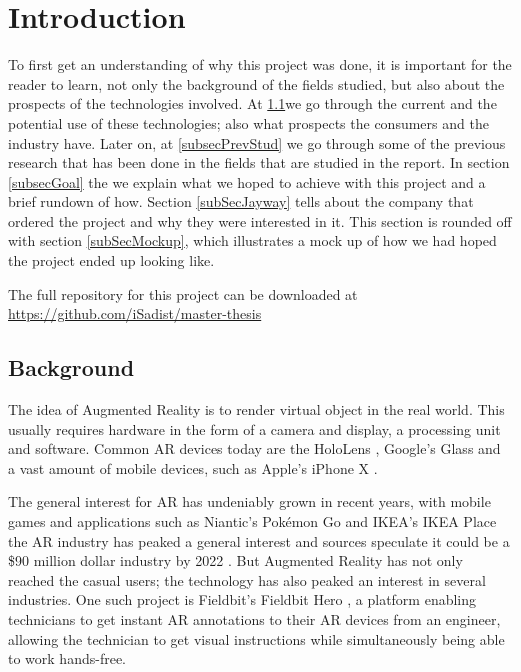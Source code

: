 \chapter{Introduction}
To first get an understanding of why this project was done, it is important for the reader to learn, not only the background of the fields studied, but also about the prospects of the technologies involved.
 At \ref{subsecBackground}we go through the current and the potential use of these technologies; also what prospects the consumers and the industry have. Later on, at  \ref{subsecPrevStud} we go through some of the previous research that has been done in the fields that are studied in the report. In section \ref{subsecGoal} the we explain what we hoped to achieve with this project and a brief rundown of how. Section \ref{subSecJayway} tells about the company that ordered the project and why they were interested in it. This section is rounded off with section \ref{subSecMockup}, which illustrates a mock up of how we had hoped the project ended up looking like.
 
 The full repository for this project can be downloaded at \url{https://github.com/iSadist/master-thesis}

\section{Background}
\label{subsecBackground}
The idea of Augmented Reality is to render virtual object in the real world. This usually requires hardware in the form of a camera and display, a processing unit and software. Common AR devices today are the HoloLens \cite{microsoft}, Google's Glass \cite{googleGlasses} and a vast amount of mobile devices, such as Apple's iPhone X \cite{appleAR}. 

The general interest for AR has undeniably grown in recent years, with mobile games and applications such as Niantic's Pokémon Go \cite{pokemonGO} and IKEA's IKEA Place \cite{IKEAPlace} the AR industry has peaked a general interest and sources speculate it could be a \$90 million dollar industry by 2022 \cite{digi-capital}.
 But Augmented Reality has not only reached the casual users; the technology has also peaked an interest in several industries. One such project is Fieldbit's Fieldbit Hero \cite{fieldbit}, a platform enabling technicians to get instant AR annotations to their AR devices from an engineer, allowing the technician to get visual instructions while simultaneously  being able to work hands-free. 
 
